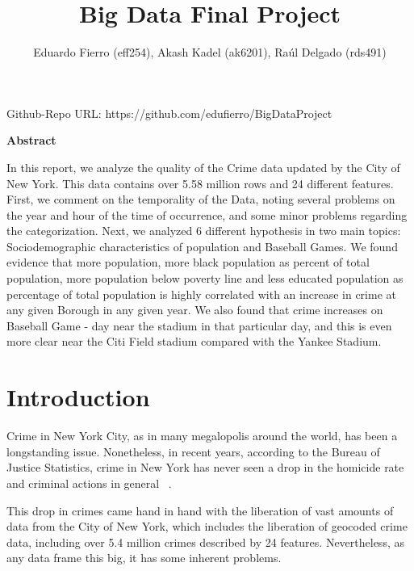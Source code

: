 \documentclass{article}
\title{Big Data Final Project}
\author {Eduardo Fierro (eff254), Akash Kadel (ak6201), Raúl Delgado (rds491)}
\begin{document}
\maketitle
\begin{center}
Github-Repo URL: https://github.com/edufierro/BigDataProject
\end{center}

\bigskip
\bigskip


\begin{center}
\textbf{Abstract}
\end{center}
\bigskip

In this report, we analyze the quality of the Crime data updated by the City of New York. This data contains over 5.58 million rows and 24 different features. First, we comment on the temporality of the Data, noting several problems on the year and hour of the time of occurrence, and some minor problems regarding the categorization. Next, we analyzed 6 different hypothesis in two main topics: Sociodemographic characteristics of population and Baseball Games. We found evidence that more population, more black population as percent of total population, more population below poverty line and less educated population as percentage of total population is highly correlated with an increase in crime at any given Borough in any given year. We also found that crime increases on Baseball Game - day near the stadium in that particular day, and this is even more clear near the Citi Field stadium compared with the Yankee Stadium. 

\pagebreak
\tableofcontents
\pagebreak

\section{Introduction}

Crime in New York City, as in many megalopolis around the world, has been a longstanding issue. Nonetheless, in recent years, according to the Bureau of Justice Statistics, crime in New York has never seen a drop in the homicide rate and criminal actions in general ~\autocite{drop_in_Crime1}.  

This drop in crimes came hand in hand with the liberation of vast amounts of data from the City of New York, which includes the liberation of geocoded crime data, including over 5.4 million crimes described by 24 features. Nevertheless, as any data frame this big, it has some inherent problems. 
\end{document}

